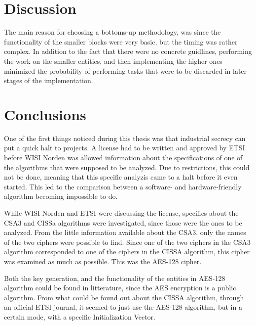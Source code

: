 \section{Discussion}
The main reason for choosing a bottoms-up methodology, was since the 
functionality of the smaller blocks were very basic, but the timing was 
rather complex. In addition to the fact that there were no concrete 
guidlines, performing the work on the smaller entities, and then 
implementing the higher ones minimized the probability of performing 
tasks that were to be discarded in later stages of the implementation.

\section{Conclusions}
One of the first things noticed during this thesis was that industrial
secrecy can put a quick halt to projects. A license had to be written 
and approved by ETSI before WISI Norden was allowed information about 
the specifications of one of the algorithms that were supposed to be
analyzed. Due to restrictions, this could not be done, meaning that 
this specific analyzis came to a halt before it even started. This 
led to the comparison between a software- and hardware-friendly 
algorithm becoming impossible to do. 

While WISI Norden and ETSI were discussing the license, specifics about 
the CSA3 and CISSa algorithms were investigated, since those were the 
ones to be analyzed. From the little information available about 
the CSA3, only the names of the two ciphers were possible to find. 
Since one of the two ciphers in the CSA3 algorithm corresponded to one 
of the ciphers in the CISSA algorithm, this cipher was examined as much 
as possible. This was the AES-128 cipher.

Both the key generation, and the functionality of the entities in 
AES-128 algorithm could be found in litterature, since the AES 
encryption is a public algorithm. From what could be found out about 
the CISSA algorithm, through an official ETSI journal, it seemed to 
just use the AES-128 algorithm, but in a certain mode, with a specific 
Initialization Vector.
